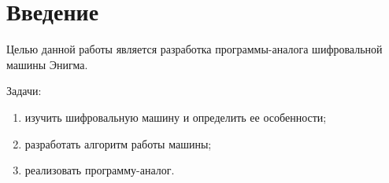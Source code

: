 \section*{Введение}

Целью данной работы является разработка программы-аналога шифровальной машины
Энигма.

Задачи:
\begin{enumerate}
    \item изучить шифровальную машину и определить ее особенности;
    \item разработать алгоритм работы машины;
    \item реализовать программу-аналог.
\end{enumerate}

\pagebreak

